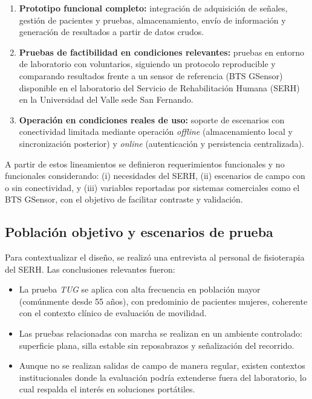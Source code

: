 \documentclass[12pt]{report}
\begin{document}
\begin{justify}
    \begin{enumerate}
        \item \textbf{Prototipo funcional completo:} integración de adquisición de señales, gestión de pacientes y pruebas, almacenamiento, envío de información y generación de resultados a partir de datos crudos.
        \item \textbf{Pruebas de factibilidad en condiciones relevantes:} pruebas en entorno de laboratorio con voluntarios, siguiendo un protocolo reproducible y comparando resultados frente a un sensor de referencia (BTS GSensor) disponible en el laboratorio del Servicio de Rehabilitación Humana (SERH) en la Universidad del Valle sede San Fernando.
        \item \textbf{Operación en condiciones reales de uso:} soporte de escenarios con conectividad limitada mediante operación \textit{offline} (almacenamiento local y sincronización posterior) y \textit{online} (autenticación y persistencia centralizada).
    \end{enumerate}

    A partir de estos lineamientos se definieron requerimientos funcionales y no funcionales considerando: (i) necesidades del SERH, (ii) escenarios de campo con o sin conectividad, y (iii) variables reportadas por sistemas comerciales como el BTS GSensor, con el objetivo de facilitar contraste y validación.

    \subsection{Población objetivo y escenarios de prueba}
    \label{subsec:poblacion-escenarios}

    Para contextualizar el diseño, se realizó una entrevista al personal de fisioterapia del SERH. Las conclusiones relevantes fueron:

    \begin{itemize}
        \item La prueba \textit{TUG} se aplica con alta frecuencia en población mayor (comúnmente desde 55 años), con predominio de pacientes mujeres, coherente con el contexto clínico de evaluación de movilidad.
        \item Las pruebas relacionadas con marcha se realizan en un ambiente controlado: superficie plana, silla estable sin reposabrazos y señalización del recorrido.
        \item Aunque no se realizan salidas de campo de manera regular, existen contextos institucionales donde la evaluación podría extenderse fuera del laboratorio, lo cual respalda el interés en soluciones portátiles.
    \end{itemize}


\end{justify}
\end{document}
